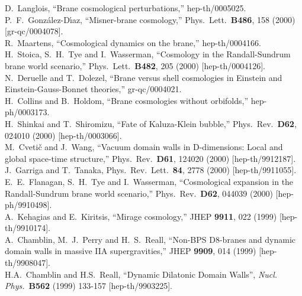 \documentclass[a4paper,10pt]{article}
\begin{document}
\begin{thebibliography}{99}
D.~Langlois,
``Brane cosmological perturbations,''
hep-th/0005025.
\\
P.~F.~Gonz\'alez-D{\'\i}az,
``Misner-brane cosmology,''
Phys.\ Lett.\  {\bf B486}, 158 (2000)
[gr-qc/0004078].
\\
R.~Maartens,
``Cosmological dynamics on the brane,''
hep-th/0004166.
\\
H.~Stoica, S.~H.~Tye and I.~Wasserman,
``Cosmology in the Randall-Sundrum brane world scenario,''
Phys.\ Lett.\  {\bf B482}, 205 (2000)
[hep-th/0004126].
\\
N.~Deruelle and T.~Dolezel,
``Brane versus shell cosmologies in Einstein and Einstein-Gauss-Bonnet  theories,''
gr-qc/0004021.
\\
H.~Collins and B.~Holdom,
``Brane cosmologies without orbifolds,''
hep-ph/0003173.
\\
H.~Shinkai and T.~Shiromizu,
``Fate of Kaluza-Klein bubble,''
Phys.\ Rev.\  {\bf D62}, 024010 (2000)
[hep-th/0003066].
\\
M.~Cveti\v{c} and J.~Wang,
``Vacuum domain walls in D-dimensions: Local and global space-time  structure,''
Phys.\ Rev.\  {\bf D61}, 124020 (2000)
[hep-th/9912187].
\\
J.~Garriga and T.~Tanaka,
Phys.\ Rev.\ Lett.\  {\bf 84}, 2778 (2000)
[hep-th/9911055].
\\
E.~E.~Flanagan, S.~H.~Tye and I.~Wasserman,
``Cosmological expansion in the Randall-Sundrum brane world scenario,''
Phys.\ Rev.\  {\bf D62}, 044039 (2000)
[hep-ph/9910498].
\\
A.~Kehagias and E.~Kiritsis,
``Mirage cosmology,''
JHEP {\bf 9911}, 022 (1999)
[hep-th/9910174].
\\
A.~Chamblin, M.~J.~Perry and H.~S.~Reall,
``Non-BPS D8-branes and dynamic domain walls in massive IIA  supergravities,''
JHEP {\bf 9909}, 014 (1999)
[hep-th/9908047].
\\
H.A.~Chamblin and H.S.~Reall, 
``Dynamic Dilatonic Domain Walls'',
{\it Nucl.  Phys.}\ {\bf B562} (1999) 133-157
[hep-th/9903225].

\end{thebibliography}
\end{document}
